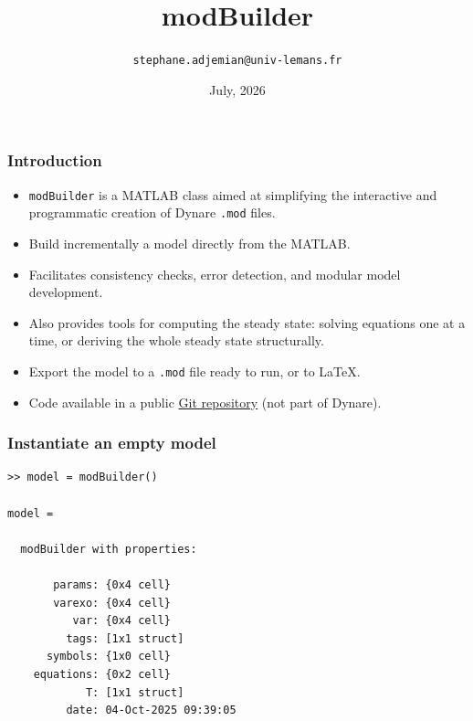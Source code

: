 \documentclass[10pt,slidestop]{beamer}
\theoremstyle{plain}
\begin{document}
\title{modBuilder}
\author[]{\texttt{stephane.adjemian@univ-lemans.fr}}
\date{July,  2026}

\begin{frame}
  \titlepage{}
\end{frame}

\begin{frame}[fragile]
  \frametitle{Introduction}

  \bigskip

  \begin{itemize}

  \item \verb+modBuilder+ is a MATLAB class aimed at simplifying the interactive and
    programmatic creation of Dynare \verb+.mod+ files.\newline

  \item Build incrementally a model directly from the MATLAB.\newline

  \item Facilitates consistency checks, error detection, and modular
    model development.\newline

  \item Also provides tools for computing the steady state: solving equations
    one at a time, or deriving the whole steady state structurally.\newline

  \item Export the model to a \verb+.mod+ file ready to run, or to LaTeX.\newline

  \item Code available in a public \href{https://git.dynare.org/stepan-a/modbuilder}{Git repository} (not part of Dynare).

  \end{itemize}

\end{frame}


\begin{frame}[fragile]
  \frametitle{Instantiate an empty model}

\begin{lstlisting}[style=MatlabConsole]
>> model = modBuilder()

model =

  modBuilder with properties:

       params: {0x4 cell}
       varexo: {0x4 cell}
          var: {0x4 cell}
         tags: [1x1 struct]
      symbols: {1x0 cell}
    equations: {0x2 cell}
            T: [1x1 struct]
         date: 04-Oct-2025 09:39:05
   \end{lstlisting}

\end{frame}
\end{document}
